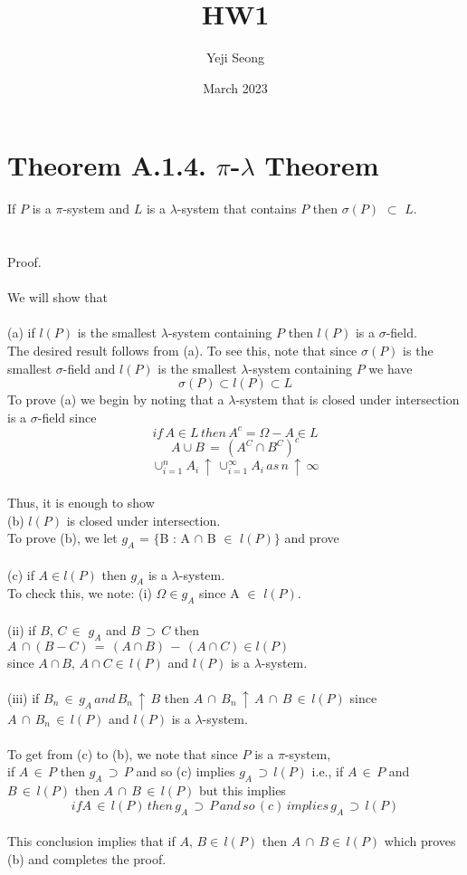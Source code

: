 \documentclass{article}
\title{HW1}
\author{Yeji Seong­}
\date{March 2023}
\begin{document}
\maketitle

\section{Theorem A.1.4. $\pi$-$\lambda$ Theorem}
If $P$ is a $\pi$-system and $L$ is a $\lambda$-system that contains $P$ then $\sigma(P)$ $\subset$ $L$.\\
\\
\\
Proof.\\
\\
We will show that\\
\\
(a) if $l(P)$ is the smallest $\lambda$-system containing $P$ then $l(P)$ is a $\sigma$-field.\\
The desired result follows from (a). To see this, note that since $\sigma(P)$ is the smallest $\sigma$-field and $l(P)$ is the smallest $\lambda$-system containing $P$ we have
$$\sigma(P) \subset l(P) \subset L$$
To prove (a) we begin by noting that a $\lambda$-system  that is closed under
intersection is a $\sigma$-field since
$$if\,A \in L\,then\,A^c = \Omega - A \in L $$
$$ A \cup B\,=\,(A^C\cap B^C)^c$$
$$ \cup_{i=1}^n A_i \,\uparrow\, \cup_{i=1}^{\infty} A_i\,as\,n\,\uparrow\,\infty$$
\\
Thus, it is enough to show\\
(b) $l(P)$ is closed under intersection.\\
To prove (b), we let $g_A$ = $\{$B : A $\cap$ B $\in$ $l(P)$$\}$ and prove\\
\\
(c) if $A \in l(P)$ then $g_A$ is a $\lambda$-system.\\
To check this, we note:  (i) $\Omega \in  g_A$ since A $\in$ $l(P)$.\\
\\
(ii) if $B,\,C\,\in$ $g_A$ and $B\,\supset\,C$ then $A\,\cap(B-C)\,=\,(A\cap B)\,-\,(A\cap C) \in l(P)$\\
since $A\cap B,\, A\cap C \in\,l(P)$ and $l(P)$ is a $\lambda$-system.\\
\\
(iii) if $B_n\,\in\,g_A\,and\,B_n\,\uparrow\,B$ then $A\,\cap\,B_n\,\uparrow\,A\,\cap\,B\,\in \,l(P)$ since $A\,\cap\,B_n\,\in\,l(P)$ and $l(P)$ is a $\lambda$-system.\\
\\
To get from (c) to (b), we note that since $P$ is a $\pi$-system,\\
if $A\,\in\,P$ then $g_A\,\supset\,P$ and so (c) implies $g_A\,\supset\,l(P)$
i.e., if $A\,\in\,P$ and $B\,\in\,l(P)$ then $A\,\cap\,B\,\in\,l(P)$ but this
implies\\
$$if A\,\in\,l(P)\,then\,g_A\,\supset\, P\,and\,so\,(c)\,implies\,g_A\,\supset\, l(P)$$
\\
This conclusion implies that if $A,\,B \in\,l(P)$ then $A\,\cap\,B\in\,l(P)$ which proves (b) and completes the proof.
\end{document}
